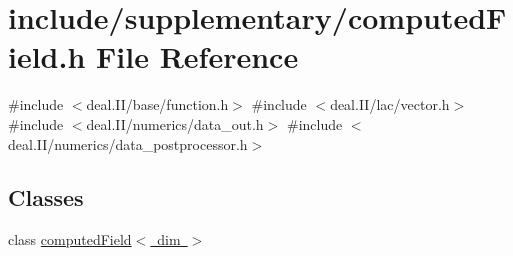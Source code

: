 \section{include/supplementary/computed\+Field.h File Reference}
\label{computed_field_8h}
{\ttfamily \#include $<$deal.\+I\+I/base/function.\+h$>$}\newline
{\ttfamily \#include $<$deal.\+I\+I/lac/vector.\+h$>$}\newline
{\ttfamily \#include $<$deal.\+I\+I/numerics/data\+\_\+out.\+h$>$}\newline
{\ttfamily \#include $<$deal.\+I\+I/numerics/data\+\_\+postprocessor.\+h$>$}\newline
\subsection*{Classes}
\begin{DoxyCompactItemize}
\item 
class \mbox{\hyperlink{classcomputed_field}{computed\+Field$<$ dim $>$}}
\end{DoxyCompactItemize}
